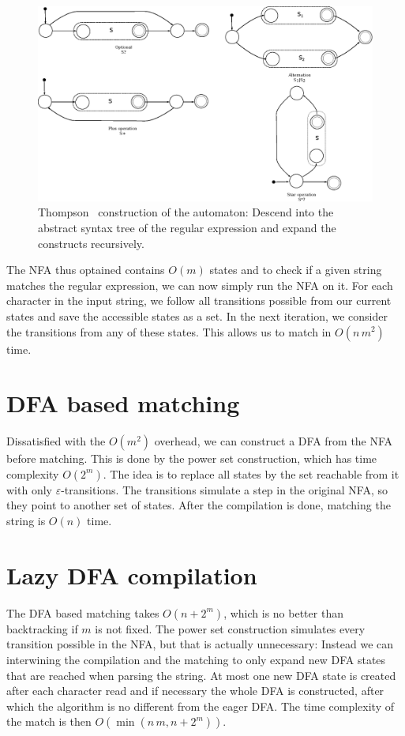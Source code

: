 \documentclass[11pt,a4paper,twoside,openright]{Thesis}
\theoremstyle{definition}
\begin{document}
\begin{figure}[htb] \includegraphics[width=\linewidth]{graphs/thompson-simple}
  \caption[Thompson construction]{Thompson~\cite{Thom68a} construction of the
automaton: Descend into the abstract syntax tree of the regular
expression and expand the constructs recursively.}
\label{fig:thompson-construction-simple} 
\end{figure}

The NFA thus optained contains $O(m)$ states and to check if a given string 
matches the regular expression, we can now simply run the NFA on it. For each 
character in the input string, we follow all transitions possible from our 
current states and save the accessible states as a set. In the next 
iteration, we consider the transitions from any of these states. This allows 
us to match in $O(n\, m^2)$ time.

\section{DFA based matching}\label{sec:dfa-match}
Dissatisfied with the $O(m^2)$ overhead, we can construct a DFA from the NFA 
before matching. This is done by the power set construction\cite{Sips05a}, 
which has time complexity $O(2^m)$. The idea is to replace all states by the 
set reachable from it with only $\varepsilon$-transitions. The transitions 
simulate a step in the original NFA, so they point to another set of states.
After the compilation is done, matching the string is $O(n)$ time.

\section{Lazy DFA compilation}\label{sec:lazy-dfa-match}
The DFA based matching takes $O(n + 2^m)$, which is no better than backtracking
if $m$ is not fixed. The power set construction simulates every transition 
possible in the NFA, but that is actually unnecessary: Instead we can 
interwining the compilation and the matching to only expand new DFA states that
are reached when parsing the string. At most one new DFA state is created after
each character read and if necessary the whole DFA is constructed, after 
which the algorithm is no different from the eager DFA. The time complexity of
the match is then $O(\min(n\, m, n+2^m))$. 
\end{document}
